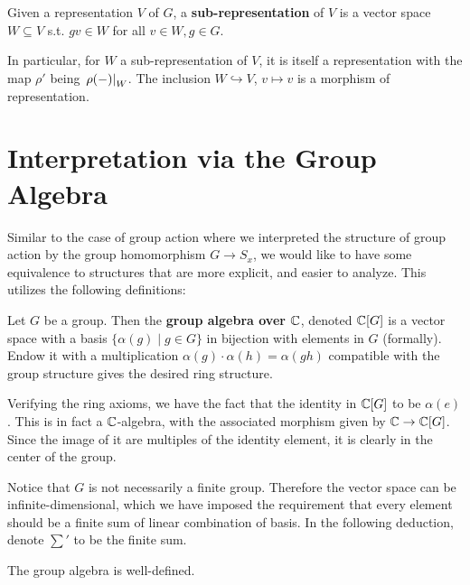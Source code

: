 \documentclass{article}
\begin{document}
\begin{definition}
    Given a representation $V$ of $G$, a \textbf{sub-representation} of $V$ is a vector space $W \subseteq V$ s.t. $gv \in W$ for all $v \in W, g \in G$. 
\end{definition}

\begin{remark}
    In particular, for $W$ a sub-representation of $V$, it is itself a representation with the map $\rho'$ being $\left.\rho(-)\right|_{W}$. The inclusion $W \hookrightarrow V$, $v \mapsto v$ is a morphism of representation.
\end{remark}

\section{Interpretation via the Group Algebra}

\textstart
Similar to the case of group action where we interpreted the structure of group action by the group homomorphism $G \to S_x$, we would like to have some equivalence to structures that are more explicit, and easier to analyze. This utilizes the following definitions:

\begin{definition}
    Let $G$ be a group. Then the \textbf{group algebra over $\mathbb{C}$}, denoted $\mathbb{C}[G]$ is a vector space with a basis $\{ \alpha(g) \mid g \in G \}$ in bijection with elements in $G$ (formally). Endow it with a multiplication $\alpha(g) \cdot \alpha(h) = \alpha(gh)$ compatible with the group structure gives the desired ring structure.
\end{definition}

\begin{remark}
    Verifying the ring axioms, we have the fact that the identity in $\mathbb{C}[G]$ to be $\alpha(e)$. This is in fact a $\mathbb{C}$-algebra, with the associated morphism given by $\mathbb{C} \to \mathbb{C}[G]$. Since the image of it are multiples of the identity element, it is clearly in the center of the group. 
\end{remark}

\textstart
Notice that $G$ is not necessarily a finite group. Therefore the vector space can be infinite-dimensional, which we have imposed the requirement that every element should be a finite sum of linear combination of basis. In the following deduction, denote $\sum'$ to be the finite sum. 

\begin{proposition}
    The group algebra is well-defined.
\end{proposition}
\end{document}
